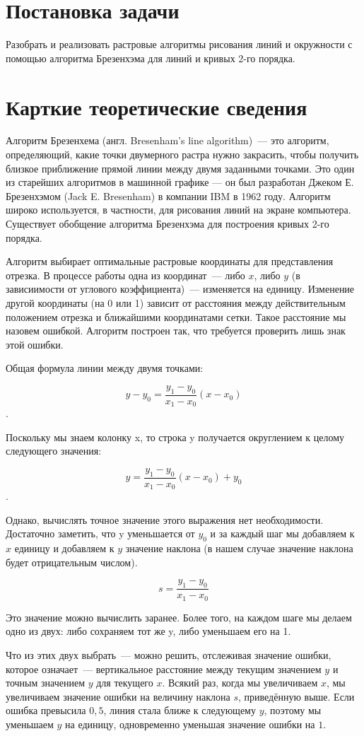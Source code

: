 \newpage
\section{Постановка задачи}
Разобрать и реализовать растровые алгоритмы рисования линий и окружности с помощью алгоритма Брезенхэма для линий и кривых 2-го порядка.

\section{Карткие теоретические сведения}
Алгоритм Брезенхема (англ. Bresenham's line algorithm)~--- это алгоритм, определяющий, какие точки двумерного растра нужно закрасить, чтобы получить близкое приближение прямой линии между двумя заданными точками. Это один из старейших алгоритмов в машинной графике — он был разработан Джеком Е. Брезенхэмом (Jack E. Bresenham) в компании IBM в 1962 году. Алгоритм широко используется, в частности, для рисования линий на экране компьютера. Существует обобщение алгоритма Брезенхэма для построения кривых 2-го порядка.

Алгоритм выбирает оптимальные растровые координаты для представления отрезка. В процессе работы одна из координат~--- либо $x$, либо $y$ (в зависиимости от углового коэффициента)~--- изменяется на единицу. Изменение другой координаты (на 0 или 1) зависит от расстояния между действительным положением отрезка и ближайшими координатами сетки. Такое расстояние мы назовем ошибкой. Алгоритм построен так, что требуется проверить лишь знак этой ошибки. 

Общая формула линии между двумя точками:

$$y - y_0 = \frac{y_1-y_0}{x_1-x_0}(x-x_0)$$.

Поскольку мы знаем колонку x, то строка y получается округлением к целому следующего значения:

$$y = \frac{y_1-y_0}{x_1-x_0}(x-x_0) + y_0$$.

Однако, вычислять точное значение этого выражения нет необходимости. Достаточно заметить, что y уменьшается от $y_0$ и за каждый шаг мы добавляем к $x$ единицу и добавляем к $y$ значение наклона (в нашем случае значение наклона будет отрицательным числом).

$$s = \frac{y_1-y_0}{x_1-x_0}$$

Это значение можно вычислить заранее. Более того, на каждом шаге мы делаем одно из двух: либо сохраняем тот же y, либо уменьшаем его на 1.

Что из этих двух выбрать~--- можно решить, отслеживая значение ошибки, которое означает~--- вертикальное расстояние между текущим значением $y$ и точным значением $y$ для текущего $x$. Всякий раз, когда мы увеличиваем $x$, мы увеличиваем значение ошибки на величину наклона $s$, приведённую выше. Если ошибка превысила $0{,}5$, линия стала ближе к следующему $y$, поэтому мы уменьшаем $y$ на единицу, одновременно уменьшая значение ошибки на $1$.

